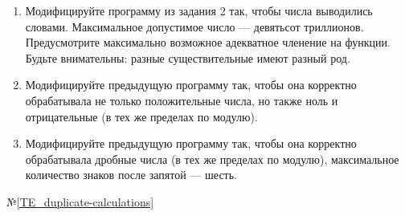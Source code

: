 \begin{enumerate}
	\item
		Модифицируйте программу из задания 2 так, чтобы числа выводились словами.
		Максимальное допустимое число --- девятьсот триллионов.
		Предусмотрите максимально возможное адекватное членение на функции.
		Будьте внимательны: разные существительные имеют разный род.
	\item
		Модифицируйте предыдущую программу так, чтобы она корректно обрабатывала не только положительные числа,
		но также ноль и отрицательные (в тех же пределах по модулю).
	\item
		Модифицируйте предыдущую программу так, чтобы она корректно обрабатывала дробные числа (в тех же пределах по модулю),
		максимальное количество знаков после запятой --- шесть.
\end{enumerate}


\typerrors
№\ref{TE_duplicate-calculations}

